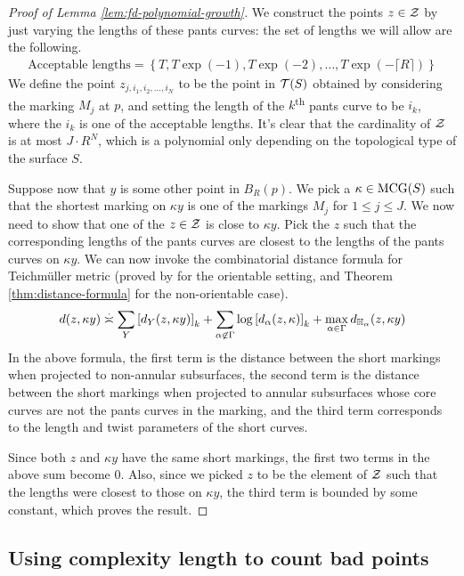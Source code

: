 \documentclass[12pt, reqno]{amsart}
\begin{document}
\begin{proof}[Proof of Lemma \ref{lem:fd-polynomial-growth}]
  We construct the points $z \in \mathcal{Z}$ by just varying the lengths of these pants curves: the set of lengths we will allow are the following.
  \begin{align*}
    \text{Acceptable lengths} = \left\{ T, T \exp(-1), T\exp(-2), \ldots, T \exp(-\lceil R \rceil) \right\}
  \end{align*}
  We define the point $z_{j, i_1, i_2, \ldots , i_N}$ to be the point in $\mathcal{T}(S)$ obtained by considering the marking $M_j$ at $p$, and setting the length of the $k$\textsuperscript{th} pants curve to be $i_k$, where the $i_k$ is one of the acceptable lengths.
  It's clear that the cardinality of $\mathcal{Z}$ is at most $J \cdot R^N$, which is a polynomial only depending on the topological type of the surface $S$.

  Suppose now that $y$ is some other point in $B_R(p)$.
  We pick a $\kappa \in \mathrm{MCG}(S)$ such that the shortest marking on $\kappa y$ is one of the markings $M_j$ for $1 \leq j \leq J$.
  We now need to show that one of the $z \in \mathcal{Z}$ is close to $\kappa y$.
  Pick the $z$ such that the corresponding lengths of the pants curves are closest to the lengths of the pants curves on $\kappa y$.
  We can now invoke the combinatorial distance formula for Teichmüller metric (proved by \textcite{rafi2007combinatorial} for the orientable setting, and Theorem \ref{thm:distance-formula} for the non-orientable case).
  \begin{align*}
    d(z, \kappa y) \emul \sum_Y \left[ d_Y(z, \kappa y) \right]_k + \sum_{\alpha \not \in \Gamma} \log \left[ d_{\alpha} (z, \kappa) \right]_k + \max_{\alpha \in \Gamma} d_{\mathbb{H}_{\alpha}} (z, \kappa y)
  \end{align*}
  In the above formula, the first term is the distance between the short markings when projected to non-annular subsurfaces, the second term is the distance between the short markings when projected to annular subsurfaces whose core curves are not the pants curves in the marking, and the third term corresponds to the length and twist parameters of the short curves.

  Since both $z$ and $\kappa y$ have the same short markings, the first two terms in the above sum become $0$.
  Also, since we picked $z$ to be the element of $\mathcal{Z}$ such that the lengths were closest to those on $\kappa y$, the third term is bounded by some constant, which proves the result.
\end{proof}


\subsection{Using complexity length to count bad points}
\label{sec:using-compl-length}
\end{document}

